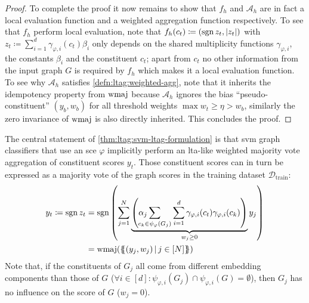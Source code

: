 \begin{proof}
	To complete the proof it now remains to show that $f_h$ and $\mathcal{A}_h$ are in fact a local evaluation function and a weighted aggregation function respectively.
	To see that $f_h$ perform local evaluation, note that $f_h(c_t) \coloneqq (\operatorname{sgn} z_t, {|z_t|})$ with $z_t \coloneqq \sum_{i=1}^{d} \gamma_{\varphi,i}(c_t) \beta_i$ only depends on the shared multiplicity functions $\gamma_{\varphi,i}$, the constants $\beta_i$ and the constituent $c_t$;
	apart from $c_t$ no other information from the input graph $G$ is required by $f_h$ which makes it a local evaluation function.
	To see why $\mathcal{A}_h$ satisfies \cref{defn:ltag:weighted-agg}, note that it inherits the idempotency property from $\operatorname{wmaj}$ because $\mathcal{A}_h$ ignores the bias ``pseudo-constituent'' $(y_b, w_b)$ for all threshold weights $\max w_t \geq \eta > w_b$, similarly the zero invariance of $\operatorname{wmaj}$ is also directly inherited.
	This concludes the proof.
\end{proof}

The central statement of \cref{thm:ltag:svm-ltag-formulation} is that \acs{svm} graph classifiers that use an \ac{sce} $\varphi$ implicitly perform an \acs{lta}-like weighted majority vote aggregation of constituent scores $y_t$.
Those constituent scores can in turn be expressed as a majority vote of the graph scores in the training dataset $\mathcal{D}_{\mathrm{train}}$:
\begin{align}
	y_t \coloneqq \sgn z_t
	 &= \sgn\left( \sum_{j=1}^N \underbrace{\left( \alpha_j \smashoperator[l]{\sum_{c_k \in \psi_{\varphi}(G_j)}} \sum_{i=1}^d \gamma_{\varphi,i}(c_t) \gamma_{\varphi,i}(c_k) \right)}_{w_j \geq 0} y_j \right) \\
	 &= \wmaj(\ldblbrace (y_j, w_j)\, |\, j \in [N] \rdblbrace) \nonumber
\end{align}
Note that, if the constituents of $G_j$ all come from different embedding components than those of $G$ ($\forall i \in [d]: {\psi_{\varphi, i}(G_j) \cap \psi_{\varphi, i}(G)} = \emptyset$), then $G_j$ has no influence on the score of $G$ ($w_j = 0$).


